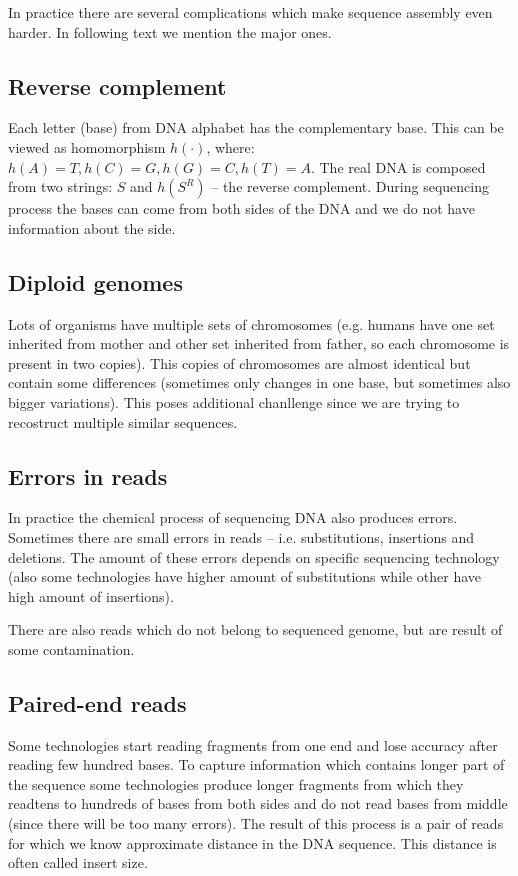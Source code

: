 In practice there are several complications which make sequence assembly even harder.
In following text we mention the major ones.

\subsection{Reverse complement}

Each letter (base) from DNA alphabet has the complementary base. This can
be viewed as homomorphism $h(\cdot)$, where: $h(A) = T, h(C) = G, h(G) = C, h(T) = A$.
The real DNA is composed from two strings: $S$ and $h(S^R)$ -- the reverse complement.
During sequencing process the bases can come from both sides of the DNA and
we do not have information about the side.

\subsection{Diploid genomes}

Lots of organisms have multiple sets of chromosomes (e.g. humans have one set
inherited from mother and other set inherited from father, so each chromosome
is present in two copies). This copies of chromosomes are almost identical but
contain some differences (sometimes only changes in one base, but sometimes also
bigger variations). This poses additional chanllenge since we are trying to recostruct
multiple similar sequences.

\subsection{Errors in reads}

In practice the chemical process of sequencing DNA also produces errors.
Sometimes there are small errors in reads -- i.e. substitutions, insertions
and deletions. The amount of these errors depends on specific sequencing technology
(also some technologies have higher amount of substitutions while other
have high amount of insertions).

There are also reads which do not belong to sequenced genome, but are result
of some contamination.

\subsection{Paired-end reads}

Some technologies start reading fragments from one end and lose accuracy after
reading few hundred bases. To capture information which contains longer part of the
sequence some technologies produce longer fragments from which they readtens to hundreds
of bases from both sides and do not read bases from middle (since there will be
too many errors). The result of this process is a pair of reads for which we know approximate
distance in the DNA sequence. This distance is often called insert size.

